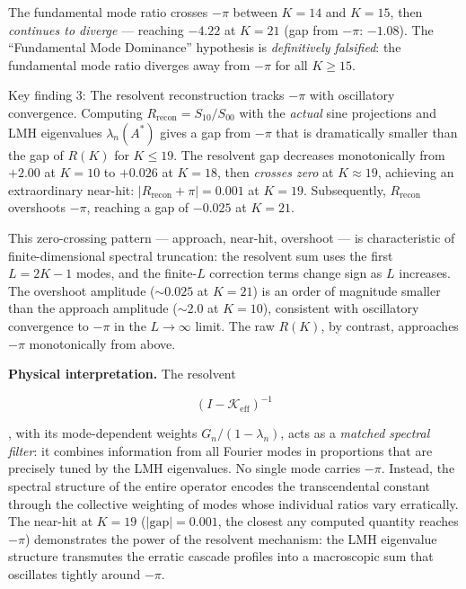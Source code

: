 \documentclass[
  11pt,
]{article}
\begin{document}
The fundamental mode ratio crosses \(-\pi\) between \(K = 14\) and \(K = 15\),
then \emph{continues to diverge} --- reaching \(-4.22\) at \(K = 21\) (gap from
\(-\pi\): \(-1.08\)). The ``Fundamental Mode Dominance'' hypothesis is
\emph{definitively falsified}: the fundamental mode ratio diverges away from
\(-\pi\) for all \(K \geq 15\).

Key finding 3: The resolvent reconstruction tracks \(-\pi\) with oscillatory
convergence. Computing \(R_{\mathrm{recon}} = S_{10}/S_{00}\) with the
\emph{actual} sine projections and LMH eigenvalues \(\lambda_n(A^{\ast})\) gives
a gap from \(-\pi\) that is dramatically smaller than the gap of \(R(K)\) for
\(K \leq 19\). The resolvent gap decreases monotonically from \(+2.00\) at
\(K = 10\) to \(+0.026\) at \(K = 18\), then \emph{crosses zero} at
\(K \approx 19\), achieving an extraordinary near-hit:
\(|R_{\mathrm{recon}} + \pi| = 0.001\) at \(K = 19\). Subsequently,
\(R_{\mathrm{recon}}\) overshoots \(-\pi\), reaching a gap of \(-0.025\) at
\(K = 21\).

This zero-crossing pattern --- approach, near-hit, overshoot --- is
characteristic of finite-dimensional spectral truncation: the resolvent sum uses
the first \(L = 2K - 1\) modes, and the finite-\(L\) correction terms change
sign as \(L\) increases. The overshoot amplitude (\(\sim 0.025\) at \(K = 21\))
is an order of magnitude smaller than the approach amplitude (\(\sim 2.0\) at
\(K = 10\)), consistent with oscillatory convergence to \(-\pi\) in the
\(L \to \infty\) limit. The raw \(R(K)\), by contrast, approaches \(-\pi\)
monotonically from above.

\textbf{Physical interpretation.} The resolvent

\[(I - \mathcal{K}_{\mathrm{eff}})^{-1}\]

, with its mode-dependent weights \(G_n/(1-\lambda_n)\), acts as a \emph{matched
spectral filter}: it combines information from all Fourier modes in proportions
that are precisely tuned by the LMH eigenvalues. No single mode carries
\(-\pi\). Instead, the spectral structure of the entire operator encodes the
transcendental constant through the collective weighting of modes whose
individual ratios vary erratically. The near-hit at \(K = 19\)
(\(\lvert \mathrm{gap}\rvert = 0.001\), the closest any computed quantity
reaches \(-\pi\)) demonstrates the power of the resolvent mechanism: the LMH
eigenvalue structure transmutes the erratic cascade profiles into a macroscopic
sum that oscillates tightly around \(-\pi\).
\end{document}
